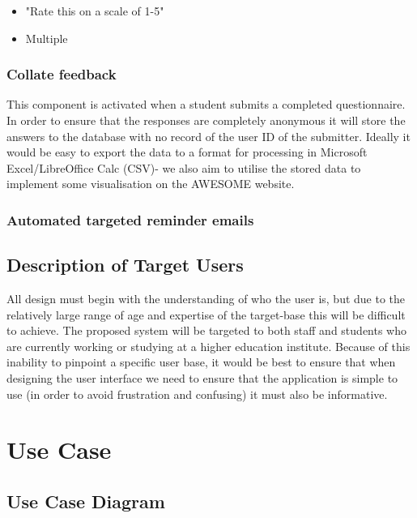 \documentclass[11pt,a4paper]{article}
\begin{document}
\begin{itemize}
	\item "Rate this on a scale of 1-5"
	\item Multiple 
\end{itemize}

\subsubsection{Collate feedback}

This component is activated when a student submits a completed questionnaire. In order to ensure that the responses are completely anonymous it will store the answers to the database with no record of the user ID of the submitter. Ideally it would be easy to export the data to a format for processing in Microsoft Excel/LibreOffice Calc (CSV)- we also aim to utilise the stored data to implement some visualisation on the AWESOME website.

\subsubsection{Automated targeted reminder emails}

\subsection{Description of Target Users}

All design must begin with the understanding of who the user is, but due to the relatively large range of age and expertise of the target-base this will be difficult to achieve. The proposed system will be targeted to both staff and students who are currently working or studying at a higher education institute. Because of this inability to pinpoint a specific user base, it would be best to ensure that when designing the user interface we need to ensure that the application is simple to use (in order to avoid frustration and confusing) it must also be informative.

\clearpage

\section{Use Case}


\subsection{Use Case Diagram}
\end{document}
